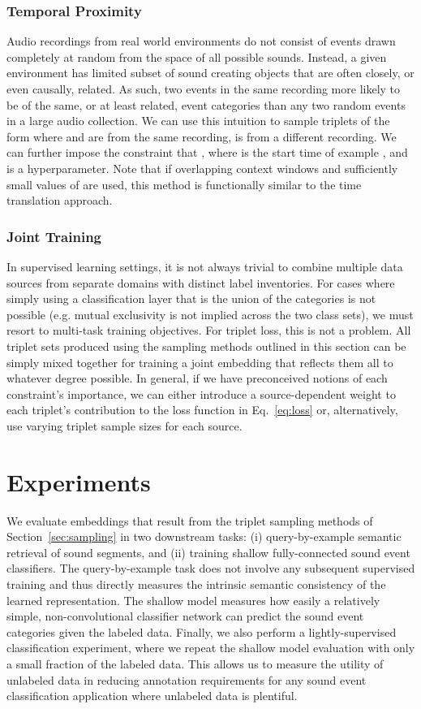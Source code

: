 \documentclass{article}
\begin{document}
\subsubsection{Temporal Proximity}
Audio recordings from real world environments do not consist of events drawn
completely at random from the space of all possible sounds.  Instead, a given
environment has limited subset of sound creating objects that are often closely,
or even causally, related.  As such, two events in the same recording more
likely to be of the same, or at least related, event categories than any two
random events in a large audio collection.  We can use this intuition to sample
triplets of the form  where  and  are from the same
recording,  is from a different recording. We can further impose the
constraint that , where
 is the start time of example , and  is a
hyperparameter.  Note that if overlapping context windows and sufficiently small
values of  are used, this method is functionally similar to the time
translation approach.

\subsubsection{Joint Training}
In supervised learning settings, it is not always trivial to combine multiple
data sources from separate domains with distinct label inventories.  For cases
where simply using a classification layer that is the union of the categories is
not possible (e.g. mutual exclusivity is not implied across the two class sets),
we must resort to multi-task training objectives.  For triplet loss, this is not
a problem.  All triplet sets produced using the sampling methods outlined in
this section can be simply mixed together for training a joint embedding that
reflects them all to whatever degree possible.  In general, if we have
preconceived notions of each constraint's importance, we can either introduce a
source-dependent weight to each triplet's contribution to the loss function in
Eq.~\ref{eq:loss} or, alternatively, use varying triplet sample sizes for each
source.

\section{Experiments}
\label{sec:exp}

We evaluate embeddings that result from the triplet sampling methods of
Section~\ref{sec:sampling} in two downstream tasks: (i) query-by-example
semantic retrieval of sound segments, and (ii) training shallow fully-connected
sound event classifiers.  The query-by-example task does not involve any
subsequent supervised training and thus directly measures the intrinsic semantic
consistency of the learned representation.  The shallow model measures how
easily a relatively simple, non-convolutional classifier network can predict the
sound event categories given the labeled data.  Finally, we also perform a
lightly-supervised classification experiment, where we repeat the shallow model
evaluation with only a small fraction of the labeled data.  This allows us to
measure the utility of unlabeled data in reducing annotation requirements for
any sound event classification application where unlabeled data is plentiful.   
\end{document}
